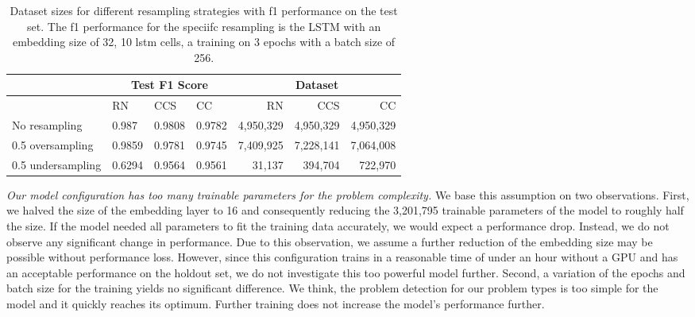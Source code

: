 \begin{table}[]
    \tabcolsep=0.11cm
    \begin{tabularx}{\textwidth}{lXXX|rrr}
    \toprule
                        & \multicolumn{3}{c}{Test F1 Score} & \multicolumn{3}{c}{Dataset}   \\ \midrule
                        & RN        & CCS        & CC     & RN            & CCS         & CC          \\ \midrule
    No resampling     &  0.987   &  0.9808    &  0.9782  &  4,950,329    & 4,950,329   & 4,950,329   \\
    0.5 oversampling  &  0.9859   &  0.9781   &  0.9745  &  7,409,925    & 7,228,141   & 7,064,008   \\
    0.5 undersampling &  0.6294   &  0.9564   &  0.9561  &  31,137       & 394,704     & 722,970     \\ \bottomrule
    \end{tabularx}
    \caption{Dataset sizes for different resampling strategies with f1 performance on the test set. The f1 performance for the speciifc resampling is the LSTM with an embedding size of 32, 10 lstm cells, a training on 3 epochs with a batch size of 256.}
    \label{tab:resampling_size_performance_lstm}
\end{table}


\textit{Our model configuration has too many trainable parameters for the problem complexity.} We base this assumption on two observations. First, we halved the size of the embedding layer to 16 and consequently reducing the 3,201,795 trainable parameters of the model to roughly half the size. If the model needed all parameters to fit the training data accurately, we would expect a performance drop. Instead, we do not observe any significant change in performance. Due to this observation, we assume a further reduction of the embedding size may be possible without performance loss. However, since this configuration trains in a reasonable time of under an hour without a GPU and has an acceptable performance on the holdout set, we do not investigate this too powerful model further.
Second, a variation of the epochs and batch size for the training yields no significant difference. We think, the problem detection for our problem types is too simple for the model and it quickly reaches its optimum. Further training does not increase the model's performance further. 

\begin{center}
\end{center}

